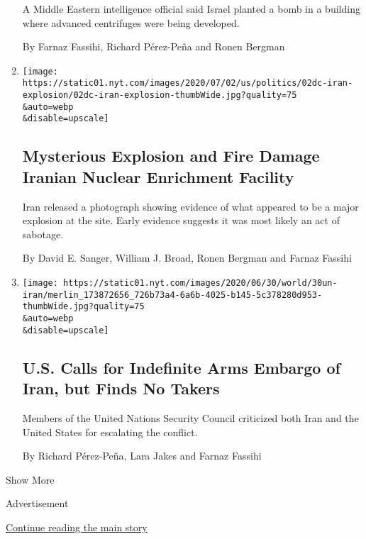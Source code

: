 \begin{enumerate}
  A Middle Eastern intelligence official said Israel planted a bomb in a
  building where advanced centrifuges were being developed.

  By Farnaz Fassihi, Richard Pérez-Peña and Ronen Bergman
\item
  \href{/2020/07/02/us/politics/iran-explosion-nuclear-centrifuges.html}{}

  \texttt{[image: https://static01.nyt.com/images/2020/07/02/us/politics/02dc-iran-explosion/02dc-iran-explosion-thumbWide.jpg?quality=75\\\&auto=webp\\\&disable=upscale]}

  \hypertarget{mysterious-explosion-and-fire-damage-iranian-nuclear-enrichment-facility}{%
  \subsection{Mysterious Explosion and Fire Damage Iranian Nuclear
  Enrichment
  Facility}\label{mysterious-explosion-and-fire-damage-iranian-nuclear-enrichment-facility}}

  Iran released a photograph showing evidence of what appeared to be a
  major explosion at the site. Early evidence suggests it was most
  likely an act of sabotage.

  By David E. Sanger, William J. Broad, Ronen Bergman and Farnaz Fassihi
\item
  \href{/2020/06/30/world/middleeast/Iran-arms-embargo.html}{}

  \texttt{[image: https://static01.nyt.com/images/2020/06/30/world/30un-iran/merlin\_173872656\_726b73a4-6a6b-4025-b145-5c378280d953-thumbWide.jpg?quality=75\\\&auto=webp\\\&disable=upscale]}

  \hypertarget{us-calls-for-indefinite-arms-embargo-of-iran-but-finds-no-takers}{%
  \subsection{U.S. Calls for Indefinite Arms Embargo of Iran, but Finds
  No
  Takers}\label{us-calls-for-indefinite-arms-embargo-of-iran-but-finds-no-takers}}

  Members of the United Nations Security Council criticized both Iran
  and the United States for escalating the conflict.

  By Richard Pérez-Peña, Lara Jakes and Farnaz Fassihi
\end{enumerate}

Show More

Advertisement

\protect\hyperlink{after-mid2}{Continue reading the main story}

